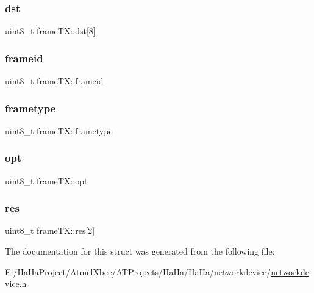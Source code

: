 \mbox{\label{structframe_t_x_ac6af0f89587bfdd91eabbc1664ed0b18}} 
\subsubsection{\texorpdfstring{dst}{dst}}
{\footnotesize\ttfamily uint8\+\_\+t frame\+T\+X\+::dst\mbox{[}8\mbox{]}}

\mbox{\label{structframe_t_x_a81728989f69fb448c3107efe57d9acee}} 
\subsubsection{\texorpdfstring{frameid}{frameid}}
{\footnotesize\ttfamily uint8\+\_\+t frame\+T\+X\+::frameid}

\mbox{\label{structframe_t_x_ae0184264e132f9acfedd9d73e067d749}} 
\subsubsection{\texorpdfstring{frametype}{frametype}}
{\footnotesize\ttfamily uint8\+\_\+t frame\+T\+X\+::frametype}

\mbox{\label{structframe_t_x_a683e80dc13eeb1ab084dcc79deea00a1}} 
\subsubsection{\texorpdfstring{opt}{opt}}
{\footnotesize\ttfamily uint8\+\_\+t frame\+T\+X\+::opt}

\mbox{\label{structframe_t_x_aaa8e3f6c37ba7164586ece2aa05d02d1}} 
\subsubsection{\texorpdfstring{res}{res}}
{\footnotesize\ttfamily uint8\+\_\+t frame\+T\+X\+::res\mbox{[}2\mbox{]}}



The documentation for this struct was generated from the following file\+:\begin{DoxyCompactItemize}
\item 
E\+:/\+Ha\+Ha\+Project/\+Atmel\+Xbee/\+A\+T\+Projects/\+Ha\+Ha/\+Ha\+Ha/networkdevice/\hyperlink{networkdevice_8h}{networkdevice.\+h}\end{DoxyCompactItemize}
